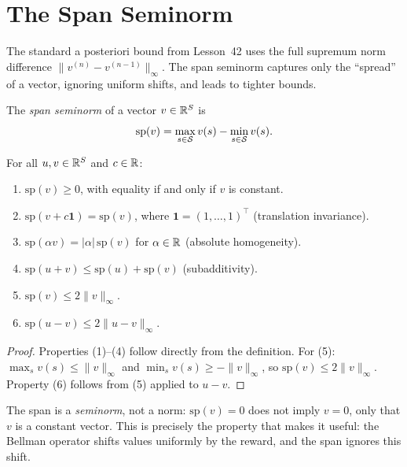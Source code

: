 \documentclass[11pt,a4paper]{article}
\begin{document}

\section{The Span Seminorm}
\label{sec:span}

The standard a posteriori bound from Lesson~42 uses the full
supremum norm difference $\|v^{(n)} - v^{(n-1)}\|_\infty$. The
span seminorm captures only the ``spread'' of a vector, ignoring
uniform shifts, and leads to tighter bounds.

\begin{definition}
\label{def:span}
The \emph{span seminorm} of a vector $v \in \mathbb{R}^S$ is
\[
    \mathrm{sp}(v) = \max_{s \in \mathcal{S}} v(s) -
    \min_{s \in \mathcal{S}} v(s).
\]
\end{definition}

\begin{proposition}
\label{prop:span-properties}
For all $u, v \in \mathbb{R}^S$ and $c \in \mathbb{R}$:
\begin{enumerate}[nosep]
    \item $\mathrm{sp}(v) \geq 0$, with equality if and only if $v$
    is constant.
    \item $\mathrm{sp}(v + c \mathbf{1}) = \mathrm{sp}(v)$, where
    $\mathbf{1} = (1,\ldots,1)^\top$ (translation invariance).
    \item $\mathrm{sp}(\alpha v) = |\alpha|\, \mathrm{sp}(v)$ for
    $\alpha \in \mathbb{R}$ (absolute homogeneity).
    \item $\mathrm{sp}(u + v) \leq \mathrm{sp}(u) + \mathrm{sp}(v)$
    (subadditivity).
    \item $\mathrm{sp}(v) \leq 2\|v\|_\infty$.
    \item $\mathrm{sp}(u - v) \leq 2\|u - v\|_\infty$.
\end{enumerate}
\end{proposition}

\begin{proof}
Properties (1)--(4) follow directly from the definition. For (5):
$\max_s v(s) \leq \|v\|_\infty$ and
$\min_s v(s) \geq -\|v\|_\infty$, so
$\mathrm{sp}(v) \leq 2\|v\|_\infty$. Property (6) follows from (5)
applied to $u - v$.
\end{proof}

\begin{remark}
\label{rem:span-not-norm}
The span is a \emph{seminorm}, not a norm: $\mathrm{sp}(v) = 0$ does
not imply $v = 0$, only that $v$ is a constant vector. This is
precisely the property that makes it useful: the Bellman operator
shifts values uniformly by the reward, and the span ignores this
shift.
\end{remark}
\end{document}

